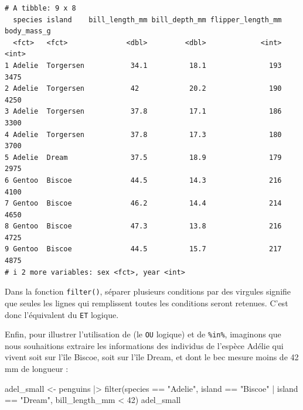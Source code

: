 \documentclass[
  a4paper,
  DIV=11,
  numbers=noendperiod,
  oneside]{scrreprt}
\newenvironment{Shaded}{}{}
\newcommand{\DecValTok}[1]{\textcolor[rgb]{0.00,0.36,0.77}{#1}}
\newcommand{\FunctionTok}[1]{\textcolor[rgb]{0.44,0.26,0.76}{#1}}
\newcommand{\NormalTok}[1]{\textcolor[rgb]{0.14,0.16,0.18}{#1}}
\newcommand{\OtherTok}[1]{\textcolor[rgb]{0.44,0.26,0.76}{#1}}
\newcommand{\SpecialCharTok}[1]{\textcolor[rgb]{0.00,0.36,0.77}{#1}}
\newcommand{\StringTok}[1]{\textcolor[rgb]{0.01,0.18,0.38}{#1}}
\begin{document}
\begin{verbatim}
# A tibble: 9 x 8
  species island    bill_length_mm bill_depth_mm flipper_length_mm body_mass_g
  <fct>   <fct>              <dbl>         <dbl>             <int>       <int>
1 Adelie  Torgersen           34.1          18.1               193        3475
2 Adelie  Torgersen           42            20.2               190        4250
3 Adelie  Torgersen           37.8          17.1               186        3300
4 Adelie  Torgersen           37.8          17.3               180        3700
5 Adelie  Dream               37.5          18.9               179        2975
6 Gentoo  Biscoe              44.5          14.3               216        4100
7 Gentoo  Biscoe              46.2          14.4               214        4650
8 Gentoo  Biscoe              47.3          13.8               216        4725
9 Gentoo  Biscoe              44.5          15.7               217        4875
# i 2 more variables: sex <fct>, year <int>
\end{verbatim}

Dans la fonction \texttt{filter()}, séparer plusieurs conditions par des
virgules signifie que seules les lignes qui remplissent toutes les
conditions seront retenues. C'est donc l'équivalent du \texttt{ET}
logique.

Enfin, pour illustrer l'utilisation de \texttt{\textbar{}} (le
\texttt{OU} logique) et de \texttt{\%in\%}, imaginons que nous
souhaitions extraire les informations des individus de l'espèce Adélie
qui vivent soit sur l'île Biscoe, soit sur l'île Dream, et dont le bec
mesure moins de 42 mm de longueur :

\begin{Shaded}
\begin{Highlighting}[]
\NormalTok{adel\_small }\OtherTok{\textless{}{-}}\NormalTok{ penguins }\SpecialCharTok{|\textgreater{}} 
  \FunctionTok{filter}\NormalTok{(species }\SpecialCharTok{==} \StringTok{"Adelie"}\NormalTok{, }
\NormalTok{         island }\SpecialCharTok{==} \StringTok{"Biscoe"} \SpecialCharTok{|}\NormalTok{ island }\SpecialCharTok{==} \StringTok{"Dream"}\NormalTok{, }
\NormalTok{         bill\_length\_mm }\SpecialCharTok{\textless{}} \DecValTok{42}\NormalTok{)}
\NormalTok{adel\_small}
\end{Highlighting}
\end{Shaded}
\end{document}
